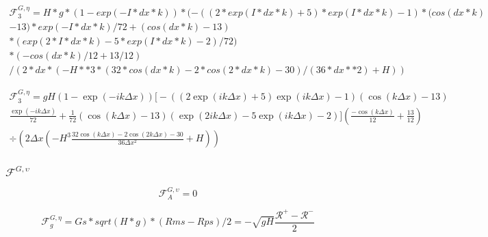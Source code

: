 \documentclass[12pt]{article}
\begin{document}
  \begin{multline}
  \mathcal{F}^{G,\eta}_3 = H*g*(1 - exp(-I*dx*k))*(-((2*exp(I*dx*k) + 5)*exp(I*dx*k) - 1)*(cos(dx*k)\\ - 13)*exp(-I*dx*k)/72 + (cos(dx*k) - 13)\\*(exp(2*I*dx*k) - 5*exp(I*dx*k) - 2)/72)\\*(-cos(dx*k)/12 + 13/12)\\/(2*dx*(-H**3*(32*cos(dx*k) - 2*cos(2*dx*k) - 30)/(36*dx**2) + H))
  \end{multline}
  
\begin{multline}
\mathcal{F}^{G,\eta}_3 = gH \left(1 - \exp(-ik\Delta x)\right)\Bigg[ -\left(\left(2\exp(ik\Delta x) + 5\right)\exp(ik\Delta x)  -1\right)\left(\cos\left(k \Delta x\right) - 13\right) \\
\frac{\exp(-ik\Delta x)}{72} + \frac{1}{72}\left(\cos\left(k \Delta x\right) - 13\right)\left(\exp(2ik\Delta x) - 5 \exp(ik\Delta x) - 2\right)\Bigg]\left(\frac{-\cos\left(k \Delta x\right)}{12} + \frac{13}{12}\right) \\ \div \left(2 \Delta x \left(-H^3\frac{32 \cos\left(k\Delta x\right) - 2\cos\left(2 k \Delta x\right) -30}{36 \Delta x^2} + H\right)\right)
\end{multline}
  
  \subsubsection{$\mathcal{F}^{G,\upsilon}$}
  
   \[\mathcal{F}^{G,\upsilon}_A =  0\]
   
   \[\mathcal{F}^{G,\eta}_g = Gs*sqrt(H*g)*(Rms - Rps)/2 = -\sqrt{gH} \frac{\mathcal{R}^+ - \mathcal{R}^-}{2}\]

 
\end{document}
